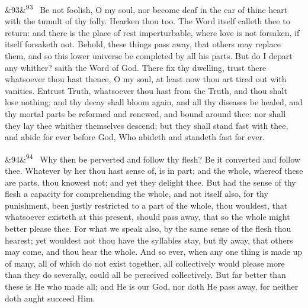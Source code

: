 \documentclass[12pt]{article}
\newcommand{\para}[1][]{\par\noindent\ifx&#1&\else\textsuperscript{\footnotesize #1}~\fi}
\begin{document}
\para[93] Be not foolish, O my soul, nor become deaf in the ear of thine heart with the tumult of thy folly. Hearken thou too. The Word itself calleth thee to return: and there is the place of rest imperturbable, where love is not forsaken, if itself forsaketh not. Behold, these things pass away, that others may replace them, and so this lower universe be completed by all his parts. But do I depart any whither? saith the Word of God. There fix thy dwelling, trust there whatsoever thou hast thence, O my soul, at least now thou art tired out with vanities. Entrust Truth, whatsoever thou hast from the Truth, and thou shalt lose nothing; and thy decay shall bloom again, and all thy diseases be healed, and thy mortal parts be reformed and renewed, and bound around thee: nor shall they lay thee whither themselves descend; but they shall stand fast with thee, and abide for ever before God, Who abideth and standeth fast for ever.

\para[94] Why then be perverted and follow thy flesh? Be it converted and follow thee. Whatever by her thou hast sense of, is in part; and the whole, whereof these are parts, thou knowest not; and yet they delight thee. But had the sense of thy flesh a capacity for comprehending the whole, and not itself also, for thy punishment, been justly restricted to a part of the whole, thou wouldest, that whatsoever existeth at this present, should pass away, that so the whole might better please thee. For what we speak also, by the same sense of the flesh thou hearest; yet wouldest not thou have the syllables stay, but fly away, that others may come, and thou hear the whole. And so ever, when any one thing is made up of many, all of which do not exist together, all collectively would please more than they do severally, could all be perceived collectively. But far better than these is He who made all; and He is our God, nor doth He pass away, for neither doth aught succeed Him.
\end{document}

